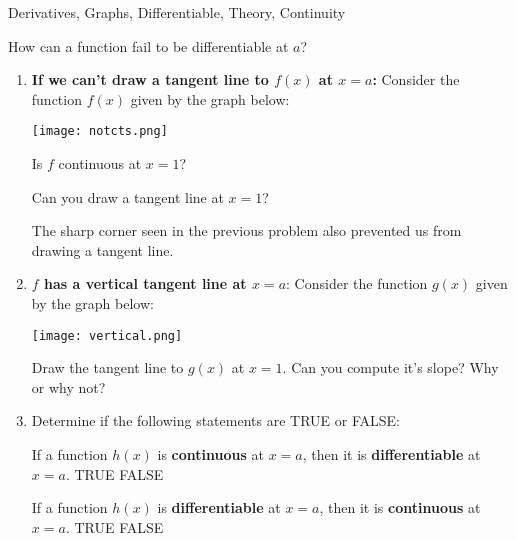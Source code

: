 \begin{tagblock}{Derivatives, Graphs, Differentiable, Theory, Continuity}
\begin{question}
	
{How can a function fail to be differentiable at $a$?}

\begin{enumerate}
\item \textbf{If we can't draw a tangent line to $f(x)$ at $x=a$:}  
Consider the function $f(x)$ given by the graph below:
\begin{minipage}{.4\textwidth}
\texttt{[image: notcts.png]} 
\end{minipage}%
\begin{minipage}{.6\textwidth}
Is $f$ continuous at $x=1$? \\ \vspace{.5in}

 Can you draw a tangent line at $x=1$?  
\end{minipage}


The sharp corner seen in the previous problem also prevented us from drawing a tangent line.  
\bigskip


\item \textbf{$f$ has a vertical tangent line at $x=a$}: Consider the function $g(x)$ given by the graph below:
\begin{minipage}{.4\textwidth}
\texttt{[image: vertical.png]} 
\end{minipage}%
\begin{minipage}{.6\textwidth}
Draw the tangent line to $g(x)$ at $x=1$.  Can you compute it's slope?  Why or why not?  

\end{minipage}




\item  Determine if the following statements are TRUE or FALSE:

If a function $h(x)$ is \textbf{continuous} at $x=a$, then it is \textbf{differentiable} at $x=a$. \hfill TRUE \hspace{.2in} FALSE

\bigskip


If a function $h(x)$ is \textbf{differentiable} at $x=a$, then it is \textbf{continuous} at $x=a$. \hfill TRUE \hspace{.2in} FALSE




\end{enumerate}
\end{question}
\end{tagblock}
